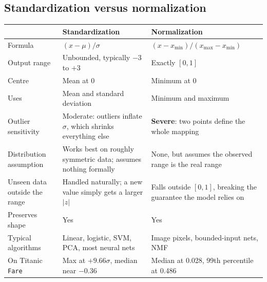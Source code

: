 \documentclass[11pt,a4paper]{article}
\begin{document}

\subsection{Standardization versus normalization}

\begin{tabularx}{\textwidth}{@{}l X X@{}}
\toprule
\rowcolor{tablehead} & \textbf{Standardization} & \textbf{Normalization} \\
\midrule
Formula & $(x - \mu) / \sigma$ & $(x - x_{\min}) / (x_{\max} - x_{\min})$ \\
Output range & Unbounded, typically $-3$ to $+3$ & Exactly $[0, 1]$ \\
Centre & Mean at 0 & Minimum at 0 \\
Uses & Mean and standard deviation & Minimum and maximum \\
Outlier sensitivity & Moderate: outliers inflate $\sigma$, which shrinks everything else & \textbf{Severe}: two points define the whole mapping \\
Distribution assumption & Works best on roughly symmetric data; assumes nothing formally & None, but assumes the observed range is the real range \\
Unseen data outside the range & Handled naturally; a new value simply gets a larger $|z|$ & Falls outside $[0, 1]$, breaking the guarantee the model relies on \\
Preserves shape & Yes & Yes \\
Typical algorithms & Linear, logistic, SVM, PCA, most neural nets & Image pixels, bounded-input nets, NMF \\
On Titanic \texttt{Fare} & Max at $+9.66\sigma$, median near $-0.36$ & Median at 0.028, 99th percentile at 0.486 \\
\bottomrule
\end{tabularx}


\end{document}

